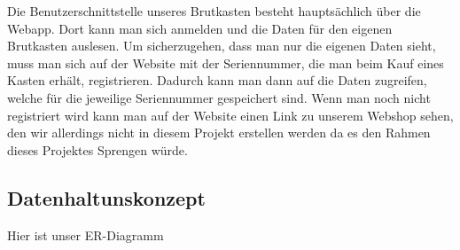 Die Benutzerschnittstelle unseres Brutkasten besteht hauptsächlich über die Webapp. Dort kann man sich anmelden und die Daten für den eigenen Brutkasten auslesen. Um sicherzugehen, dass man nur die eigenen Daten sieht, muss man sich auf der Website mit der Seriennummer, die man beim Kauf eines Kasten erhält, registrieren. Dadurch kann man dann auf die Daten zugreifen, welche für die jeweilige Seriennummer gespeichert sind.
\newline
Wenn man noch nicht registriert wird kann man auf der Website einen Link zu unserem Webshop sehen, den wir allerdings nicht in diesem Projekt erstellen werden da es den Rahmen dieses Projektes Sprengen würde.
\newpage
\subsection{Datenhaltunskonzept}
Hier ist unser ER-Diagramm
